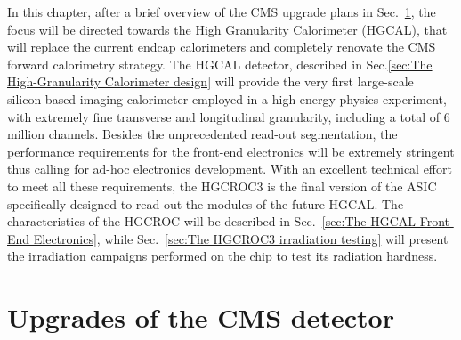 \bigbreak

In this chapter, after a brief overview of the CMS upgrade plans in Sec.~\ref{sec:Upgrades of the CMS detector}, the focus will be directed towards the High Granularity Calorimeter (HGCAL), that will replace the current endcap calorimeters and completely renovate the CMS forward calorimetry strategy. The HGCAL detector, described in Sec.\ref{sec:The High-Granularity Calorimeter design} will provide the very first large-scale silicon-based imaging calorimeter employed in a high-energy physics experiment, with extremely fine transverse and longitudinal granularity, including a total of 6 million channels. Besides the unprecedented read-out segmentation, the performance requirements for the front-end electronics will be extremely stringent thus calling for ad-hoc electronics development. With an excellent technical effort to meet all these requirements, the HGCROC3 is the final version of the ASIC specifically designed to read-out the modules of the future HGCAL. 
The characteristics of the HGCROC will be described in Sec.~\ref{sec:The HGCAL Front-End Electronics}, while Sec.~\ref{sec:The HGCROC3 irradiation testing} will present the irradiation campaigns performed on the chip to test its radiation hardness. 


\section{Upgrades of the CMS detector}
\label{sec:Upgrades of the CMS detector}

